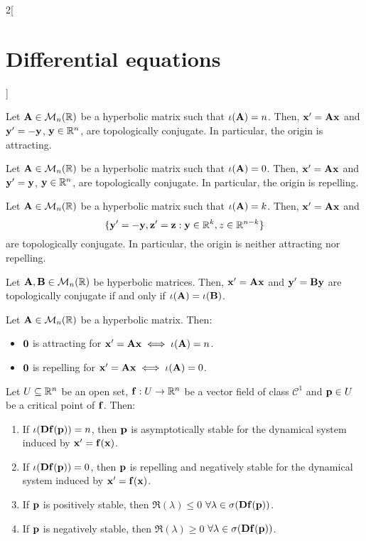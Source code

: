 \documentclass[../../../main.tex]{subfiles}
\begin{document}
\begin{multicols}{2}[\section{Differential equations}]
\begin{theorem}
    Let $\vf{A}\in\mathcal{M}_n(\RR)$ be a hyperbolic matrix such that $\iota(\vf{A})=n$. Then, $\vf{x}'=\vf{A}\vf{x}$ and $\vf{y}'=-\vf{y}$, $\vf{y}\in\RR^n$, are topologically conjugate. In particular, the origin is attracting.
  \end{theorem}
  \begin{corollary}
    Let $\vf{A}\in\mathcal{M}_n(\RR)$ be a hyperbolic matrix such that $\iota(\vf{A})=0$. Then, $\vf{x}'=\vf{A}\vf{x}$ and $\vf{y}'=\vf{y}$, $\vf{y}\in\RR^n$, are topologically conjugate. In particular, the origin is repelling.
  \end{corollary}
  \begin{corollary}
    Let $\vf{A}\in\mathcal{M}_n(\RR)$ be a hyperbolic matrix such that $\iota(\vf{A})=k$. Then, $\vf{x}'=\vf{A}\vf{x}$ and $$\{\vf{y}'=-\vf{y}, \vf{z}'=\vf{z}:\vf{y}\in\RR^k,{z}\in\RR^{n-k}\}$$ are topologically conjugate. In particular, the origin is neither attracting nor repelling.
  \end{corollary}
  \begin{theorem}
    Let $\vf{A},\vf{B}\in\mathcal{M}_n(\RR)$ be hyperbolic matrices. Then, $\vf{x}'=\vf{A}\vf{x}$ and $\vf{y}'=\vf{B}\vf{y}$ are topologically conjugate if and only if $\iota(\vf{A})=\iota(\vf{B})$.
  \end{theorem}
  \begin{corollary}
    Let $\vf{A}\in\mathcal{M}_n(\RR)$ be a hyperbolic matrix. Then:
    \begin{itemize}
      \item $\vf{0}$ is attracting for $\vf{x}'=\vf{A}\vf{x}\iff\iota(\vf{A})=n$.
      \item $\vf{0}$ is repelling for $\vf{x}'=\vf{A}\vf{x}\iff\iota(\vf{A})=0$.
    \end{itemize}
  \end{corollary}
  \begin{theorem}
    Let $U\subseteq \RR^n$ be an open set, $\vf{f}:U\rightarrow\RR^n$ be a vector field of class $\mathcal{C}^1$ and $\vf{p}\in U$ be a critical point of $\vf{f}$. Then:
    \begin{enumerate}
      \item If $\iota(\vf{Df}(\vf{p}))=n$, then $\vf{p}$ is asymptotically stable for the dynamical system induced by $\vf{x}'=\vf{f}(\vf{x})$.
      \item If $\iota(\vf{Df}(\vf{p}))=0$, then $\vf{p}$ is repelling and negatively stable for the dynamical system induced by $\vf{x}'=\vf{f}(\vf{x})$.
      \item If $\vf{p}$ is positively stable, then $\Re(\lambda)\leq 0$ $\forall\lambda\in\sigma(\vf{Df}(\vf{p}))$.
      \item If $\vf{p}$ is negatively stable, then $\Re(\lambda)\geq 0$ $\forall\lambda\in\sigma(\vf{Df}(\vf{p}))$.
    \end{enumerate}
  \end{theorem}

\end{multicols}
\end{document}
